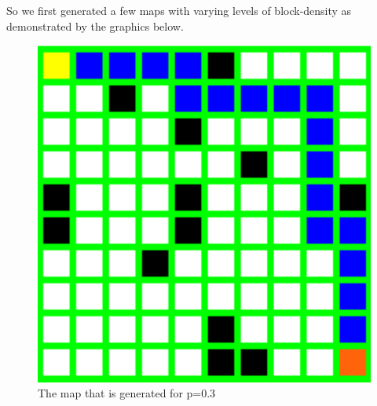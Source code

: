 \documentclass[11pt]{scrartcl} %
\begin{document}
So we first generated a few maps with varying levels of block-density as demonstrated by the graphics below. \\
\begin{figure}[H]
 	\begin{center}
 	\includegraphics*[scale=0.3]{GUI3C.png}
	\caption{The map that is generated for p=0.3}
	\label{fig:example}
	
 	\end{center}
 
 \end{figure}
\end{document}
